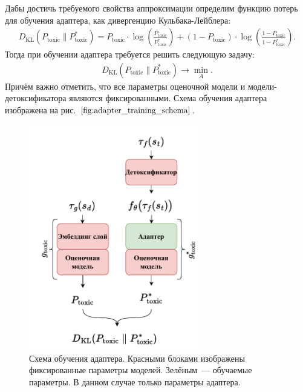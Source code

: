 Дабы достичь требуемого свойства аппроксимации определим функцию потерь для обучения адаптера, как дивергенцию Кульбака-Лейблера:
\begin{gather*}
    D_\text{KL} \left(P_{\text{toxic}} \parallel P^{*}_{\text{toxic}} \right) 
    = P_{\text{toxic}} \cdot \log\left(\frac{P_{\text{toxic}}}{P^{*}_{\text{toxic}}}\right) 
    + \left(1 - P_{\text{toxic}} \right) \cdot \log\left(\frac{1 - P_{\text{toxic}}}{1 - P^{*}_{\text{toxic}}}\right).
\end{gather*}
Тогда при обучении адаптера требуется решить следующую задачу:
\begin{gather*}
    D_\text{KL}\left(P_{\text{toxic}} \parallel P^{*}_{\text{toxic}} \right) \longrightarrow \min_{A}.
\end{gather*}
Причём важно отметить, что все параметры оценочной модели и модели-детоксификатора являются фиксированными.
Схема обучения адаптера изображена на рис. $\ref{fig:adapter_training_schema}$.
\begin{figure}[ht]
      \centering
      \includegraphics[width=0.66\textwidth]{images/adapter_train.pdf}
      \caption{
        Схема обучения адаптера.
        Красными блоками изображены фиксированные параметры моделей.
        Зелёным~--- обучаемые параметры. 
        В данном случае только параметры адаптера.
    }
      \label{fig:adapter_training_schema}
\end{figure}

